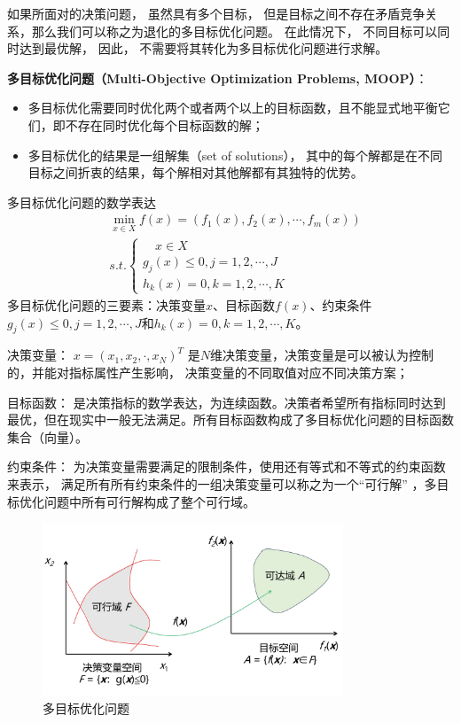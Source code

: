 如果所面对的决策问题， 虽然具有多个目标， 但是目标之间不存在矛盾竞争关系，那么我们可以称之为退化的多目标优化问题。 在此情况下， 不同目标可以同时达到最优解， 因此， 不需要将其转化为多目标优化问题进行求解。

\textbf{多目标优化问题（Multi-Objective Optimization Problems, MOOP）}：

\begin{itemize}[itemsep=0pt,parsep=0pt]
    \item 多目标优化需要同时优化两个或者两个以上的目标函数，且不能显式地平衡它们，即不存在同时优化每个目标函数的解；
    \item 多目标优化的结果是一组解集（set of solutions）， 其中的每个解都是在不同目标之间折衷的结果，每个解相对其他解都有其独特的优势。
\end{itemize}

多目标优化问题的数学表达
\begin{equation}
    \begin{aligned}
         & \min_{x \in X} f(x) = (f_1(x),f_2(x),\cdots,f_m(x)) \\
         & s.t.   \begin{cases}
                      \quad x \in X                   \\
                      g_j(x) \leq 0, j = 1,2,\cdots,J \\
                      h_k(x) = 0, k = 1,2,\cdots,K
                  \end{cases}
    \end{aligned}
\end{equation}
多目标优化问题的三要素：决策变量$x$、目标函数$f(x)$、约束条件$g_j(x) \leq 0, j = 1,2,\cdots,J$和$h_k(x) = 0, k = 1,2,\cdots,K$。

决策变量： $x=(x_1, x_2, \cdot, x_N)^T$ 是$N$维决策变量，决策变量是可以被认为控制的，并能对指标属性产生影响， 决策变量的不同取值对应不同决策方案；

目标函数： 是决策指标的数学表达，为连续函数。决策者希望所有指标同时达到最优，但在现实中一般无法满足。所有目标函数构成了多目标优化问题的目标函数集合（向量）。

约束条件： 为决策变量需要满足的限制条件，使用还有等式和不等式的约束函数来表示， 满足所有所有约束条件的一组决策变量可以称之为一个“可行解” ，多目标优化问题中所有可行解构成了整个可行域。

\begin{figure}[ht]
    \centering
    \includegraphics[width=0.8\textwidth]{pic/2.7.1.png}
    \caption{多目标优化问题}
\end{figure}

